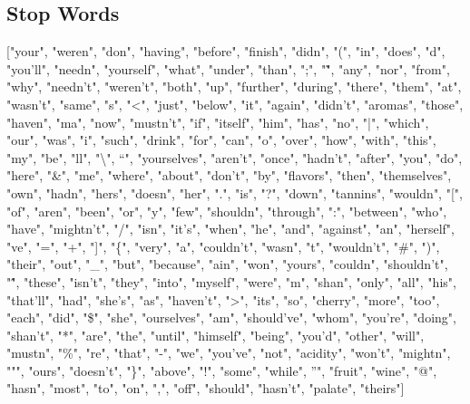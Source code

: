 \documentclass[11pt]{article}
\begin{document}
\subsection{Stop Words}
["your", "weren", "don", "having", "before", "finish", "didn", "(", "in", "does", "d", "you'll", "needn", "yourself", "what", "under", "than", ";", "\~", "any", "nor", "from", "why", "needn't", "weren't", "both", "up", "further", "during", "there", "them", "at", "wasn't", "same", "s", "<", "just", "below", "it", "again", "didn't", "aromas", "those", "haven", "ma", "now", "mustn't", "if", "itself", "him", "has", "no", "|", "which", "our", "was", "i", "such", "drink", "for", "can", "o", "over", "how", "with", "this", "my", "be", "ll", "\textbackslash", "`", "yourselves", "aren't", "once", "hadn't", "after", "you", "do", "here", "\&", "me", "where", "about", "don't", "by", "flavors", "then", "themselves", "own", "hadn", "hers", "doesn", "her", ".", "is", "?", "down", "tannins", "wouldn", "[", "of", "aren", "been", "or", "y", "few", "shouldn", "through", ":", "between", "who", "have", "mightn't", "/", "isn", "it's", "when", "he", "and", "against", "an", "herself", "ve", "=", "+", "]", "\{", "very", "a", "couldn't", "wasn", "t", "wouldn't", "\#", ")", "their", "out", "\_", "but", "because", "ain", "won", "yours", "couldn", "shouldn't", "\^", "these", "isn't", "they", "into", "myself", "were", "m", "shan", "only", "all", "his", "that'll", "had", "she's", "as", "haven't", ">", "its", "so", "cherry", "more", "too", "each", "did", "\$", "she", "ourselves", "am", "should've", "whom", "you're", "doing", "shan't", "*", "are", "the", "until", "himself", "being", "you'd", "other", "will", "mustn", "\%", "re", "that", "-", "we", "you've", "not", "acidity", "won't", "mightn", """, "ours", "doesn't", "\}", "above", "!", "some", "while", "'", "fruit", "wine", "@", "hasn", "most", "to", "on", ",", "off", "should", "hasn't", "palate", "theirs"]
\end{document}
